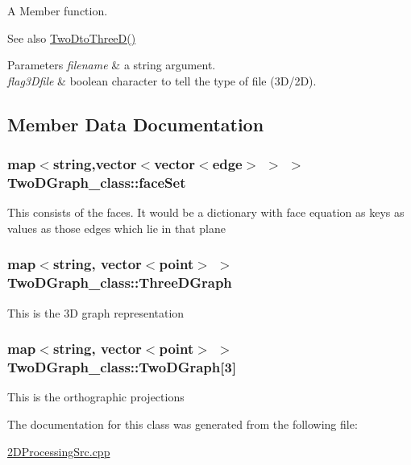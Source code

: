 A Member function. 

\begin{DoxySeeAlso}{See also}
\hyperlink{classTwoDGraph__class_a48222790dda1c34caf1366ce1cc0ce1d}{Two\+Dto\+Three\+D()} 
\end{DoxySeeAlso}

\begin{DoxyParams}{Parameters}
{\em filename} & a string argument. \\
\hline
{\em flag3\+Dfile} & boolean character to tell the type of file (3\+D/2D). \\
\hline
\end{DoxyParams}


\subsection{Member Data Documentation}
\subsubsection[{\texorpdfstring{face\+Set}{faceSet}}]{\setlength{\rightskip}{0pt plus 5cm}map$<$string,vector$<$vector$<${\bf edge}$>$ $>$ $>$ Two\+D\+Graph\+\_\+class\+::face\+Set}\hypertarget{classTwoDGraph__class_a80d22cc10e3cfa2d3f090bc0b506e2ea}{}\label{classTwoDGraph__class_a80d22cc10e3cfa2d3f090bc0b506e2ea}
This consists of the faces. It would be a dictionary with face equation as keys as values as those edges which lie in that plane 
\subsubsection[{\texorpdfstring{Three\+D\+Graph}{ThreeDGraph}}]{\setlength{\rightskip}{0pt plus 5cm}map$<$string, vector$<${\bf point}$>$ $>$ Two\+D\+Graph\+\_\+class\+::\+Three\+D\+Graph}\hypertarget{classTwoDGraph__class_a6b9cd70ed1be50fb248b56f6da30a3c5}{}\label{classTwoDGraph__class_a6b9cd70ed1be50fb248b56f6da30a3c5}
This is the 3D graph representation 
\subsubsection[{\texorpdfstring{Two\+D\+Graph}{TwoDGraph}}]{\setlength{\rightskip}{0pt plus 5cm}map$<$string, vector$<${\bf point}$>$ $>$ Two\+D\+Graph\+\_\+class\+::\+Two\+D\+Graph\mbox{[}3\mbox{]}}\hypertarget{classTwoDGraph__class_aab69ccead28f685a9e084f52e1488354}{}\label{classTwoDGraph__class_aab69ccead28f685a9e084f52e1488354}
This is the orthographic projections 

The documentation for this class was generated from the following file\+:\begin{DoxyCompactItemize}
\item 
\hyperlink{2DProcessingSrc_8cpp}{2\+D\+Processing\+Src.\+cpp}\end{DoxyCompactItemize}
